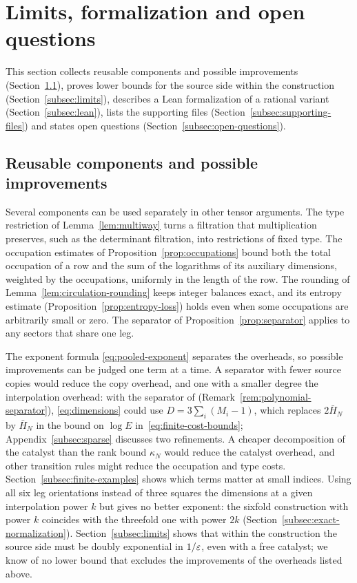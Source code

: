 \section{Limits, formalization and open questions}
\label{sec:discussion}

This section collects reusable components and possible improvements
(Section~\ref{subsec:improvements}), proves lower bounds for the source
side within the construction (Section~\ref{subsec:limits}), describes a
Lean formalization of a rational variant (Section~\ref{subsec:lean}),
lists the supporting files (Section~\ref{subsec:supporting-files}) and
states open questions (Section~\ref{subsec:open-questions}).

\subsection{Reusable components and possible improvements}
\label{subsec:improvements}

Several components can be used separately in other tensor arguments. The
type restriction of Lemma~\ref{lem:multiway} turns a filtration that
multiplication preserves, such as the determinant filtration, into
restrictions of fixed type. The
occupation estimates of Proposition~\ref{prop:occupations} bound both the
total occupation of a row and the sum of the logarithms of its auxiliary
dimensions, weighted by the occupations, uniformly in the length of the
row. The rounding of
Lemma~\ref{lem:circulation-rounding} keeps integer balances exact, and
its entropy estimate (Proposition~\ref{prop:entropy-loss}) holds even
when some occupations are arbitrarily small or zero. The separator of
Proposition~\ref{prop:separator} applies to any sectors that share one
leg.

The exponent formula \eqref{eq:pooled-exponent} separates the overheads,
so possible improvements can be judged one term at a time. A separator
with fewer source copies would reduce the copy overhead, and one with a
smaller degree the interpolation overhead: with the separator
of \citet{Lu26} (Remark~\ref{rem:polynomial-separator}),
\eqref{eq:dimensions} could use \(D=3\sum_i(M_i-1)\), which replaces
\(2\bar H_N\) by \(\bar H_N\) in the bound on \(\log E\)
in~\eqref{eq:finite-cost-bounds}; Appendix~\ref{subsec:sparse}
discusses two refinements. A cheaper
decomposition of the catalyst than the rank bound \(\kappa_N\) would
reduce the catalyst overhead, and other transition rules might reduce
the occupation and type costs.
Section~\ref{subsec:finite-examples} shows which terms matter at small
indices. Using all six leg orientations instead of three squares the dimensions
at a given interpolation power \(k\) but gives no better exponent: the
sixfold construction with power \(k\) coincides with the threefold one
with power \(2k\) (Section~\ref{subsec:exact-normalization}).
Section~\ref{subsec:limits} shows that within the construction the
source side must be doubly exponential in \(1/\varepsilon\), even with a free
catalyst; we know of no lower bound that excludes the improvements of
the overheads listed above.

